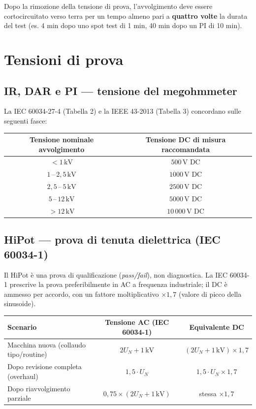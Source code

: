 \documentclass[a4paper,11pt]{article}
\begin{document}
Dopo la rimozione della tensione di prova, l'avvolgimento deve essere cortocircuitato verso terra per un tempo almeno pari a \textbf{quattro volte} la durata del test (es. 4 min dopo uno spot test di 1 min, 40 min dopo un PI di 10 min).

\section{Tensioni di prova}

\subsection{IR, DAR e PI — tensione del megohmmeter}

La IEC 60034-27-4 (Tabella 2) e la IEEE 43-2013 (Tabella 3) concordano sulle seguenti fasce:

\begin{center}
\begin{tabular}{cc}
\toprule
\textbf{Tensione nominale avvolgimento} & \textbf{Tensione DC di misura raccomandata} \\
\midrule
$< 1\,\text{kV}$       & $500\,\text{V DC}$     \\
$1\,\text{--}\,2{,}5\,\text{kV}$ & $1000\,\text{V DC}$ \\
$2{,}5\,\text{--}\,5\,\text{kV}$ & $2500\,\text{V DC}$ \\
$5\,\text{--}\,12\,\text{kV}$    & $5000\,\text{V DC}$ \\
$> 12\,\text{kV}$      & $10\,000\,\text{V DC}$ \\
\bottomrule
\end{tabular}
\end{center}

\subsection{HiPot — prova di tenuta dielettrica (IEC 60034-1)}

Il HiPot è una prova di qualificazione (\emph{pass/fail}), non diagnostica. La IEC 60034-1 prescrive la prova preferibilmente in AC a frequenza industriale; il DC è ammesso per accordo, con un fattore moltiplicativo $\times 1{,}7$ (valore di picco della sinusoide).

\begin{center}
\begin{tabular}{lcc}
\toprule
\textbf{Scenario} & \textbf{Tensione AC (IEC 60034-1)} & \textbf{Equivalente DC} \\
\midrule
Macchina nuova (collaudo tipo/routine) & $2U_N + 1\,\text{kV}$ & $(2U_N + 1\,\text{kV}) \times 1{,}7$ \\
Dopo revisione completa (overhaul)     & $1{,}5 \cdot U_N$     & $1{,}5 \cdot U_N \times 1{,}7$     \\
Dopo riavvolgimento parziale           & $0{,}75 \times (2U_N + 1\,\text{kV})$ & stessa $\times 1{,}7$ \\
\bottomrule
\end{tabular}
\end{center}
\end{document}
